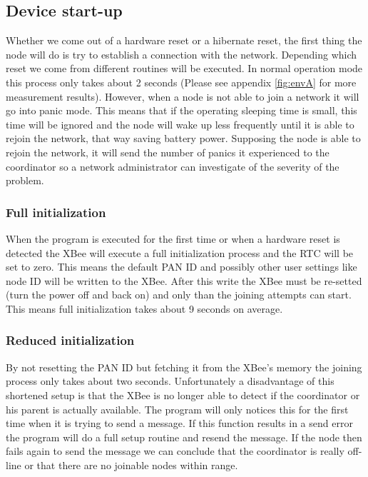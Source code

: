 \subsection{Device start-up}
Whether we come out of a hardware reset or a hibernate reset, the first thing the node will do is try to establish a connection with the network. Depending which reset we come from different routines will be executed. In normal operation mode this process only takes about 2 seconds (Please see appendix \ref{fig:envA} for more measurement results). However, when a node is not able to join a network it will go into panic mode. This means that if the operating sleeping time is small, this time will be ignored and the node will wake up less frequently until it is able to rejoin the network, that way saving battery power. Supposing the node is able to rejoin the network, it will send the number of panics it experienced to the coordinator so a network administrator can investigate of the severity of the problem.

\subsubsection{Full initialization}
When the program is executed for the first time or when a hardware reset is detected the XBee will execute a full initialization process and the RTC will be set to zero. This means the default PAN ID and possibly other user settings like node ID will be written to the XBee. After this write the XBee must be re-setted (turn the power off and back on) and only than the joining attempts can start. This means full initialization takes about 9 seconds on average. 

\subsubsection{Reduced initialization}
By not resetting the PAN ID but fetching it from the XBee's memory the joining process only takes about two seconds. Unfortunately a disadvantage of this shortened setup is that the XBee is no longer able to detect if the coordinator or his parent is actually available. The program will only notices this for the first time when it is trying to send a message. If this function results in a send error the program will do a full setup routine and resend the message. If the node then fails again to send the message we can conclude that the coordinator is really off-line or that there are no joinable nodes within range. 




